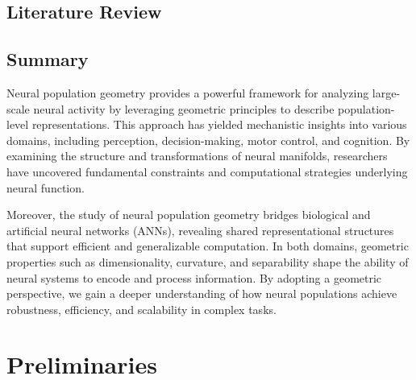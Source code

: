 \documentclass[11pt,a4paper]{article}
\begin{document}
\subsection{Literature Review}
\subsection{Summary}
Neural population geometry provides a powerful framework for analyzing large-scale neural activity by leveraging geometric principles to describe population-level representations. This approach has yielded mechanistic insights into various domains, including perception, decision-making, motor control, and cognition. By examining the structure and transformations of neural manifolds, researchers have uncovered fundamental constraints and computational strategies underlying neural function.

Moreover, the study of neural population geometry bridges biological and artificial neural networks (ANNs), revealing shared representational structures that support efficient and generalizable computation. In both domains, geometric properties such as dimensionality, curvature, and separability shape the ability of neural systems to encode and process information. By adopting a geometric perspective, we gain a deeper understanding of how neural populations achieve robustness, efficiency, and scalability in complex tasks.

\section{Preliminaries}
\end{document}
